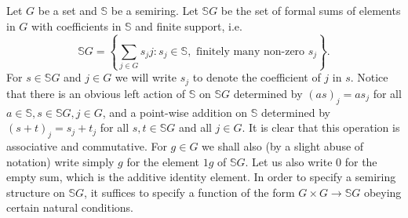 \documentclass[a4paper, 11pt]{article}
\theoremstyle{plain}
\theoremstyle{definition}
\begin{document}
Let $G$ be a set and $\mathbb{S}$ be a semiring. Let $\mathbb{S}G$ be the set of formal sums of elements in $G$ with coefficients in $\mathbb{S}$ and finite support, i.e.
\[
    \mathbb{S}G = \left\{ \sum_{j \in G} s_j j : s_j \in \mathbb{S}, \text{ finitely many non-zero } s_j \right \}.
\]
For $s \in \mathbb{S}G$  and $j \in G$ we will write $s_j$ to denote the coefficient of $j$ in $s$. Notice that there is an obvious left action of $\mathbb{S}$ on $\mathbb{S}G$ determined by $(as)_j = as_j$ for all $a \in \mathbb{S}, s \in \mathbb{S}G, j\in G$, and a point-wise addition on $\mathbb{S}$ determined by $(s+t)_j = s_j + t_j$ for all $s,t \in \mathbb{S}G$ and all $j \in G$. It is clear that this operation is associative and commutative. For $g \in G$ we shall also (by a slight abuse of notation) write simply $g$ for the element $1g$ of $\mathbb{S} G$. Let us also write $0$ for the empty sum, which is the additive identity element. In order to specify a semiring structure on $\mathbb{S}G$, it suffices to specify a function of the form $G \times G \rightarrow \mathbb{S}G$ obeying certain natural conditions.
 
\end{document}
